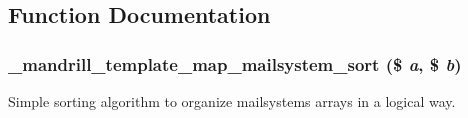 \subsection{Function Documentation}
\hypertarget{mandrill__template_8module_a51089c73974e16c1b7c794f21f849534}{
\subsubsection[{\_\-mandrill\_\-template\_\-map\_\-mailsystem\_\-sort}]{\setlength{\rightskip}{0pt plus 5cm}\_\-mandrill\_\-template\_\-map\_\-mailsystem\_\-sort (\$ {\em a}, \/  \$ {\em b})}}
\label{mandrill__template_8module_a51089c73974e16c1b7c794f21f849534}
Simple sorting algorithm to organize mailsystems arrays in a logical way.


